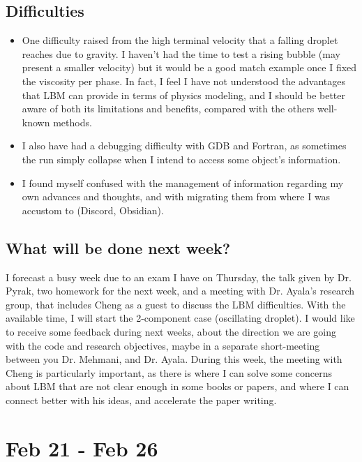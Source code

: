 \documentclass[12pt]{article}
\begin{document}
	\subsection*{Difficulties}
	\begin{itemize}
		\item One difficulty raised from the high terminal velocity that a falling droplet reaches due to gravity. I haven't had the time to test a rising bubble (may present a smaller velocity) but it would be a good match example once I fixed the viscosity per phase. In fact, I feel I have not understood the advantages that LBM can provide in terms of physics modeling, and I should be better aware of both its limitations and benefits, compared with the others well-known methods. 
		
		\item I also have had a debugging difficulty with GDB and Fortran, as sometimes the run simply collapse when I intend to access some object's information.
		
		\item I found myself confused with the management of information regarding my own advances and thoughts, and with migrating them from where I was accustom to (Discord, Obsidian).
	\end{itemize}
	 
	
	\subsection*{What will be done next week?}
	I forecast a busy week due to an exam I have on Thursday, the talk given by Dr. Pyrak, two homework for the next week, and a meeting with Dr. Ayala's research group, that includes Cheng as a guest to discuss the LBM difficulties. With the available time, I will start the 2-component case (oscillating droplet). I would like to receive some feedback during next weeks, about the direction we are going with the code and research objectives, maybe in a separate short-meeting between you Dr. Mehmani, and Dr. Ayala. During this week, the meeting with Cheng is particularly important, as there is where I can solve some concerns about LBM that are not clear enough in some books or papers, and where I can connect better with his ideas, and accelerate the paper writing. 
	
	\pagebreak
	\section*{Feb 21 - Feb 26}
\end{document}
